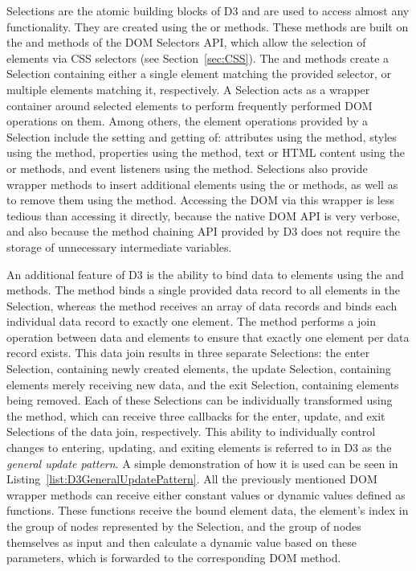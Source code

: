 Selections are the atomic building blocks of D3 and are used to access
almost any functionality. They are created using the
 or  methods. These
methods are built on the  and
 methods of the DOM Selectors API, which
allow the selection of elements via CSS selectors (see
Section~\ref{sec:CSS}). The  and
 methods create a Selection containing either
a single element matching the provided selector, or multiple elements
matching it, respectively. A Selection acts as a wrapper container
around selected elements to perform frequently performed DOM
operations on them.  Among others, the element operations provided by
a Selection include the setting and getting of: attributes using the
 method, styles using the
 method, properties using the
 method, text or HTML content using the
 or  methods, and
event listeners using the  method. Selections
also provide wrapper methods to insert additional elements using the
 or  methods,
as well as to remove them using the 
method. Accessing the DOM via this wrapper is less tedious than
accessing it directly, because the native DOM API is very verbose, and
also because the method chaining API provided by D3 does not require
the storage of unnecessary intermediate variables.

An additional feature of D3 is the ability to bind data to elements
using the  and  methods.
The  method binds a single provided data record
to all elements in the Selection, whereas the 
method receives an array of data records and binds each individual
data record to exactly one element.  The  method
performs a join operation between data and elements to ensure that
exactly one element per data record exists. This data join results in
three separate Selections: the enter Selection, containing newly
created elements, the update Selection, containing elements merely
receiving new data, and the exit Selection, containing elements being
removed. Each of these Selections can be individually transformed
using the  method, which can receive three
callbacks for the enter, update, and exit Selections of the data join,
respectively. This ability to individually control changes to
entering, updating, and exiting elements is referred to in D3 as the
\emph{general update pattern}. A simple demonstration of how it is
used can be seen in Listing~\ref{list:D3GeneralUpdatePattern}. All the
previously mentioned DOM wrapper methods can receive either constant
values or dynamic values defined as functions. These functions receive
the bound element data, the element's index in the group of nodes
represented by the Selection, and the group of nodes themselves as
input and then calculate a dynamic value based on these parameters,
which is forwarded to the corresponding DOM method.



